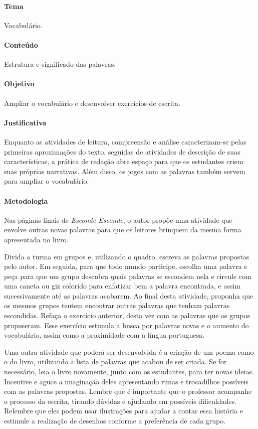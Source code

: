 \documentclass[11pt]{extarticle}
\begin{document}
\paragraph{Tema} Vocabulário. 

\paragraph{Conteúdo} Estrutura e significado das palavras.

\paragraph{Objetivo} Ampliar o vocabulário e desenvolver exercícios de escrita.

\paragraph{Justificativa} Enquanto as atividades de leitura, compreensão e análise caracterizam-se pelas primeiras aproximações do texto, seguidas de atividades de descrição de suas características, a prática de redação abre espaço para que os estudantes criem suas próprias narrativas. Além disso, os jogos com as palavras também servem para ampliar o vocabulário. 

\paragraph{Metodologia} Nas páginas finais de \textit{Esconde-Esconde}, o autor propõe uma atividade que envolve outras novas palavras para que os leitores brinquem da mesma forma apresentada no livro. 

Divida a turma em grupos e, utilizando o quadro, escreva as palavras propostas pelo autor. Em seguida, para que todo mundo participe, escolha uma palavra e peça para que um grupo descubra quais palavras se escondem nela e circule com uma caneta ou giz colorido para enfatizar bem a palavra encontrada, e assim sucessivamente até as palavras acabarem. Ao final desta atividade, proponha que os mesmos grupos tentem encontrar outras palavras que tenham palavras escondidas. Refaça o exercício anterior, desta vez com as palavras que os grupos propuseram. Esse exercício estimula a busca por palavras novas e o aumento do vocabulário, assim como a proximidade com a língua portuguesa.

Uma outra atividade que poderá ser desenvolvida é a criação de um poema como o do livro, utilizando a lista de palavras que acabou de ser criada. Se for necessário, leia  o livro novamente, junto com os estudantes, para ter novas ideias. Incentive e aguce a imaginação deles apresentando rimas e trocadilhos possíveis com as palavras propostas. Lembre que é importante que o professor acompanhe o processo da escrita, tirando dúvidas e ajudando em possíveis dificuldades. Relembre que eles podem usar ilustrações para ajudar a contar essa história e estimule a realização de desenhos conforme a preferência de cada grupo.
\end{document}
